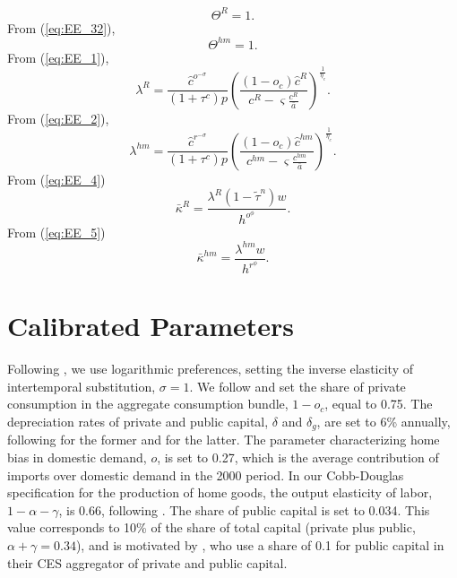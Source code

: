 \documentclass[12pt]{article}
\begin{document}
\begin{equation*}
\Theta^R =1.
\end{equation*}%
From (\ref{eq:EE_32}),%
\begin{equation*}
\Theta^{hm} =1.
\end{equation*}%
From (\ref{eq:EE_1}),
\begin{equation*}
\lambda^R=\frac{\hat{c}^{o^{-\sigma}}}{(1+\tau^c)p}\left(\frac{(1-o_c)\hat{c}^R}{c^R - \varsigma\frac{c^R}{\bar{a}} }\right)^{\frac{1}{\eta_c}}.
\end{equation*}
From (\ref{eq:EE_2}),
\begin{equation*}
\lambda^{hm}=\frac{\hat{c}^{r^{-\sigma}}}{(1+\tau^c)p}\left(\frac{(1-o_c)\hat{c}^{hm}}{c^{hm} - \varsigma\frac{c^{hm}}{\bar{a}} }\right)^{\frac{1}{\eta_c}}.
\end{equation*}
From (\ref{eq:EE_4})
\begin{equation*}
\bar{\kappa}^R=\frac{\lambda^R (1-\tilde{\tau}^n)w}{h^{o^\phi}}. 
\end{equation*}
From (\ref{eq:EE_5})
\begin{equation*}
\bar{\kappa}^{hm}=\frac{\lambda^{hm} w}{h^{r^\phi}}. 
\end{equation*}

\section{Calibrated Parameters}\label{app:calibratedparameters}
Following \citet{MedinaSoto2016}, we use logarithmic preferences, setting the inverse elasticity of intertemporal substitution, $\sigma=1$. We follow \citet{coenen2013gauging} and set the share of private consumption in the aggregate consumption bundle, $1-o_c$, equal to 0.75. The depreciation rates of private and public capital, $\delta$ and $\delta_g$, are set to 6\% annually, following \citet{MedinaSoto2016} for the former and \citet{coenen2013gauging} for the latter. The parameter characterizing home bias in domestic demand, $o$, is set to 0.27, which is the average contribution of imports over domestic demand in the 2000 period. In our Cobb-Douglas specification for the production of home goods, the output elasticity of labor, $1-\alpha-\gamma$, is 0.66, following \citet{MedinaSoto2016}. The share of public capital is set to 0.034. This value corresponds to 10\% of the share of total capital (private plus public, $\alpha+\gamma=0.34$), and is motivated by \citet{coenen2013gauging}, who use a share of 0.1 for public capital in their CES aggregator of private and public capital. 
\end{document}

